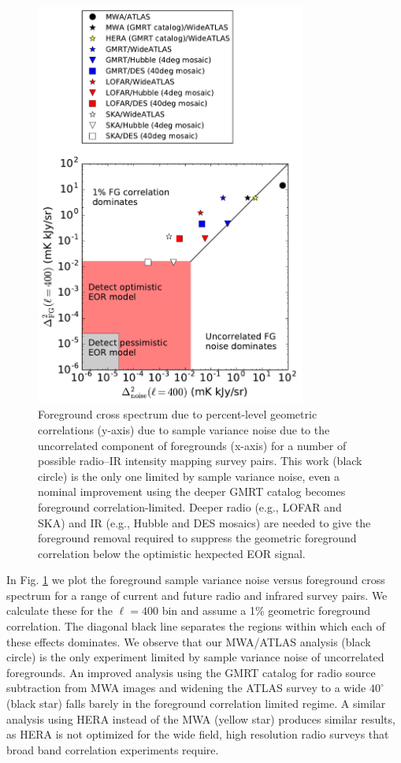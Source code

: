 \documentclass[numberedappendix]{emulateapj}
\begin{document}
\begin{figure}[h]
\centering
\includegraphics[width=3.5in]{chap5_xcor/noise_vs_corr_expt_study.pdf}
\caption{Foreground cross spectrum due to percent-level geometric correlations (y-axis) due to sample variance noise due to the uncorrelated component of foregrounds (x-axis) for a number of possible radio--IR intensity mapping survey pairs. This work (black circle) is the only one limited by sample variance noise, even a nominal improvement using the deeper GMRT catalog becomes foreground correlation-limited. Deeper radio (e.g., LOFAR and SKA) and IR (e.g., Hubble and DES mosaics) are needed to give the foreground removal required to suppress the geometric foreground correlation below the optimistic hexpected EOR signal.}
\label{fig:noisecorrstudy}
\end{figure}

In Fig. \ref{fig:noisecorrstudy} we plot the foreground sample variance noise versus foreground cross spectrum for a range of current and future radio and infrared survey pairs. We calculate these for the $\ell=400$ bin and assume a 1\% geometric foreground correlation. The diagonal black line separates the regions within which each of these effects dominates. We observe that our MWA/ATLAS analysis (black circle) is the only experiment limited by sample variance noise of uncorrelated foregrounds. An improved analysis using the GMRT catalog for radio source subtraction from MWA images and widening the ATLAS survey to a wide $40^\circ$ (black star) falls barely in the foreground correlation limited regime. A similar analysis using HERA instead of the MWA (yellow star) produces similar results, as HERA is not optimized for the wide field, high resolution radio surveys that broad band correlation experiments require. 
\end{document}
